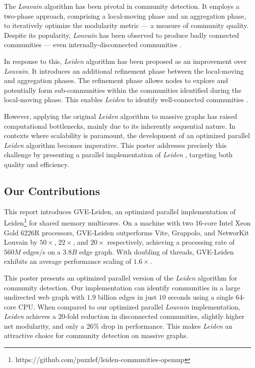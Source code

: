 The \textit{Louvain} algorithm \cite{com-blondel08} has been pivotal in community detection. It employs a two-phase approach, comprising a local-moving phase and an aggregation phase, to iteratively optimize the modularity metric --- a measure of community quality. Despite its popularity, \textit{Louvain} has been observed to produce badly connected communities --- even internally-disconnected communities \cite{com-traag19}.

In response to this, \textit{Leiden} algorithm has been proposed as an improvement over \textit{Louvain}. It introduces an additional refinement phase between the local-moving and aggregation phases. The refinement phase allows nodes to explore and potentially form sub-communities within the communities identified during the local-moving phase. This enables \textit{Leiden} to identify well-connected communities \cite{com-traag19}.

However, applying the original \textit{Leiden} algorithm to massive graphs has raised computational bottlenecks, mainly due to its inherently sequential nature. In contexts where scalability is paramount, the development of an optimized parallel \textit{Leiden} algorithm becomes imperative. This poster addresses precisely this challenge by presenting a parallel implementation of \textit{Leiden} , targeting both quality and efficiency.




\subsection{Our Contributions}

This report introduces GVE-Leiden, an optimized parallel implementation of Leiden\footnote{https://github.com/puzzlef/leiden-communities-openmp} for shared memory multicores. On a machine with two 16-core Intel Xeon Gold 6226R processors, GVE-Leiden outperforms Vite, Grappolo, and NetworKit Louvain by $50\times$, $22\times$, and $20\times$ respectively, achieving a processing rate of $560 M$ edges/s on a $3.8 B$ edge graph. With doubling of threads, GVE-Leiden exhibits an average performance scaling of $1.6\times$.

This poster presents an optimized parallel version of the \textit{Leiden} algorithm for community detection. Our implementation can identify communities in a large undirected web graph with $1.9$ billion edges in just $10$ seconds using a single 64-core CPU. When compared to our optimized parallel \textit{Louvain} implementation, \textit{Leiden} achieves a $20$-fold reduction in disconnected communities, slightly higher net modularity, and only a $26\%$ drop in performance. This makes \textit{Leiden} an attractive choice for community detection on massive graphs.



